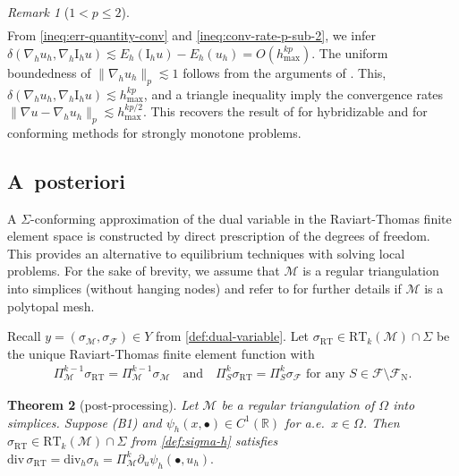 \documentclass[a4paper]{amsart}
\numberwithin{equation}{section}
\newcommand{\R}{\mathbb{R}}
\renewcommand{\div}{\mathrm{div}}
\newcommand{\Mcal}{\mathcal{M}}
\newcommand{\RT}{\mathrm{RT}}
\newtheorem{theorem}{Theorem}[section]
\theoremstyle{remark}
\newtheorem{remark}[theorem]{Remark}
\begin{document}
\begin{remark}[$1 < p \leq 2$]
\begin{align*}
	\end{align*}
	From \eqref{ineq:err-quantity-conv} and \eqref{ineq:conv-rate-p-sub-2}, we infer
    $\delta(\nabla_h u_h,\nabla_h \mathrm{I}_h u) \lesssim E_h(\mathrm{I}_h u) - E_h(u_h) = O(h_{\max}^{kp})$.
	The uniform boundedness of $\|\nabla_h u_h\|_{p} \lesssim 1$ follows from the arguments of . This, $\delta(\nabla_h u_h,\nabla_h \mathrm{I}_h u) \lesssim h_{\max}^{kp}$, and a triangle inequality imply the convergence rates $\|\nabla u - \nabla_h u_h\|_p \lesssim h_\mathrm{max}^{kp/2}$. This recovers the result of \cite{Tran2024} for hybridizable and \cite{Chow1989} for conforming methods for strongly monotone problems.
\end{remark}

\subsection{A~posteriori}\label{sec:a-posteriori}
A $\Sigma$-conforming approximation of the dual variable in the Raviart-Thomas finite element space is constructed by direct prescription of the degrees of freedom. This provides an alternative to equilibrium techniques \cite{LuceWohlmuth2004,BraessSchoeberl2008,ErnVohralik2015} with solving local problems.
For the sake of brevity, we assume that $\Mcal$ is a regular triangulation into simplices (without hanging nodes) and refer to \cite[Section 5]{Tran2024} for further details if $\Mcal$ is a polytopal mesh.

Recall $y = (\sigma_\Mcal, \sigma_\mathcal{F}) \in Y$ from \eqref{def:dual-variable}. 
Let $\sigma_\RT \in \mathrm{RT}_{k}(\Mcal) \cap \Sigma$ be the unique Raviart-Thomas finite element function with
\begin{align}\label{def:sigma-h}
	\Pi_\Mcal^{k-1} \sigma_\RT = \Pi_\Mcal^{k-1} \sigma_\Mcal \quad\text{and}\quad \Pi_S^k \sigma_\RT = \Pi_S^k \sigma_\mathcal{F} \text{ for any } S \in \mathcal{F}\setminus\mathcal{F}_\mathrm{N}.
\end{align}

\begin{theorem}[post-processing]\label{thm:post-processing}
	Let $\Mcal$ be a regular triangulation of $\Omega$ into simplices.
	Suppose (B1) and $\psi_h(x,\bullet) \in C^1(\R)$ for a.e.~$x \in \Omega$. Then $\sigma_\RT \in \RT_k(\Mcal) \cap \Sigma$ from \eqref{def:sigma-h} satisfies 
    $\div\,\sigma_\RT = \div_h \sigma_h = \Pi_\Mcal^{k} \partial_u \psi_h(\bullet,u_h).$
\end{theorem}
\end{document}
